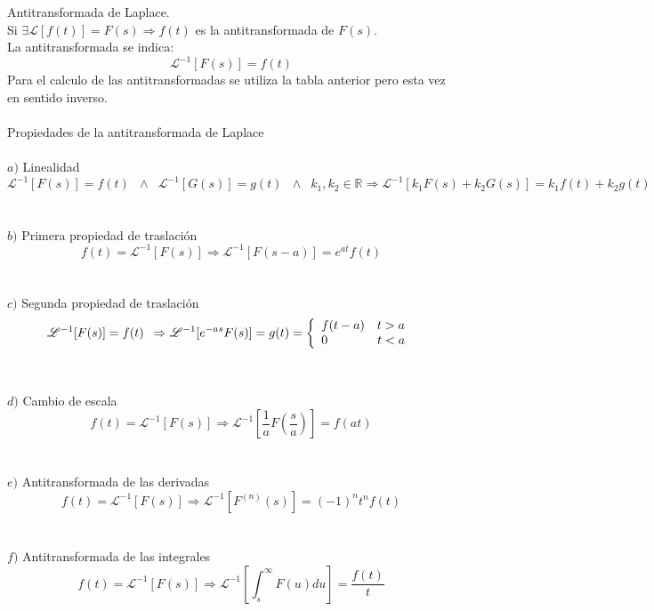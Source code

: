 \documentclass[]{article}
\begin{document}
\huge Antitransformada de Laplace.
\normalsize
\\

Si $\exists \mathscr{L}[f(t)] = F(s) \Rightarrow f(t)$ es la antitransformada de $F(s)$.
\\
La antitransformada se indica: $$\mathscr{L}^{-1}[F(s)] = f(t)$$
Para el calculo de las antitransformadas se utiliza la tabla anterior pero esta vez en sentido inverso.
\\
\\
\Large Propiedades de la antitransformada de Laplace
\normalsize
\\
\\
$a)$ Linealidad
$$
\mathscr{L}^{-1}[F(s)] = f(t)\hspace{7pt} \wedge\hspace{7pt} \mathscr{L}^{-1}[G(s)] = g(t)\hspace{7pt} \wedge\hspace{7pt} k_{1} , k_{2} \in \mathbb{R} \Rightarrow \mathscr{L}^{-1}[k_{1}F(s) + k_{2}G(s)] = k_{1} f(t) + k_{2} g(t)
$$
\\
\\
$b)$ Primera propiedad de traslación
$$
f(t) = \mathscr{L}^{-1}[F(s)] \Rightarrow \mathscr{L}^{-1}[F(s-a)] = e^{at}f(t)
$$
\\
\\
$c)$ Segunda propiedad de traslación
$$ 
\mathscr{L}^{-1}[F(s)] = f(t) \hspace{5pt}
\Rightarrow \mathscr{L}^{-1}[e^{-as}F(s)] = g(t) = \left\{
	\begin{array}{ll}
		f(t-a) \hspace{10pt} t > a \\
		0 \hspace{40pt} t < a
	\end{array}
\right. \\ 
$$
\\
\\
$d)$ Cambio de escala
$$
f(t) = \mathscr{L}^{-1}[F(s)] \Rightarrow \mathscr{L}^{-1}[\frac{1}{a}F(\frac{s}{a})] = f(at) 	
$$
\\
\\
$e)$ Antitransformada de las derivadas
$$
f(t) = \mathscr{L}^{-1}[F(s)] \Rightarrow \mathscr{L}^{-1}[F^{(n)}(s)] = (-1)^{n}t^{n}f(t) 
$$
\\
\\
$f)$ Antitransformada de las integrales
$$
f(t) = \mathscr{L}^{-1}[F(s)] \Rightarrow \mathscr{L}^{-1}[\int_s^{\infty}F(u)du] =\frac{f(t)}{t}
$$
\\
\end{document}
